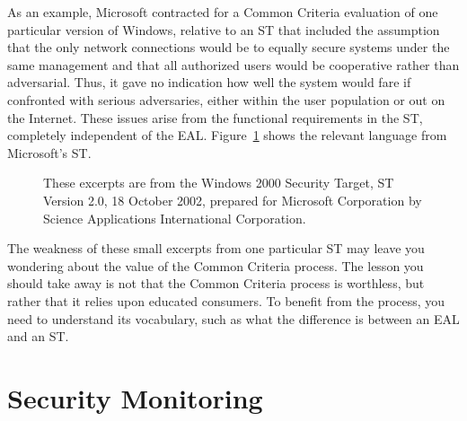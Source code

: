 As an example, Microsoft contracted for a Common Criteria evaluation
of one particular version of Windows, relative to an ST that included
the assumption that the only network connections would be to equally
secure systems under the same management and that all authorized
users would be cooperative rather than adversarial.  Thus, it gave no
indication how well the system would fare if confronted with serious
adversaries, either within the user population or out on the Internet.
These issues arise from the functional requirements in the ST,
completely independent of the EAL.  Figure~\ref{windows-st} shows the
relevant language from Microsoft's ST.
\begin{figure}
\centerline{}
\caption{These excerpts are from the Windows 2000 Security Target, ST Version
  2.0, 18 October 2002, prepared for Microsoft Corporation by Science
  Applications International Corporation.}
\label{windows-st}
\end{figure}

The weakness of these small excerpts from one particular ST may leave
you wondering about the value of the Common Criteria process.  The
lesson you should take away is not that the Common Criteria process is
worthless, but rather that it relies upon educated consumers.  To
benefit from the process, you need to understand its vocabulary, such
as what the difference is between an EAL and an ST.

\section{Security Monitoring}\label{security-monitoring-section}

